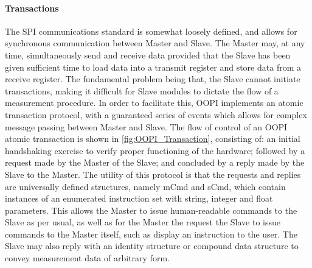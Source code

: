 \paragraph{Transactions}
\label{sec:OOPI_Transactions}
The SPI communications standard is somewhat loosely defined, and allows for synchronous communication between Master and Slave. The Master may, at any time, simultaneously send and receive data provided that the Slave has been given sufficient time to load data into a transmit register and store data from a receive register. The fundamental problem being that, the Slave cannot initiate transactions, making it difficult for Slave modules to dictate the flow of a measurement procedure. In order to facilitate this, OOPI implements an atomic transaction protocol, with a guaranteed series of events which allows for complex message passing between Master and Slave. The flow of control of an OOPI atomic transaction is shown in \cref{fig:OOPI_Transaction}, consisting of: an initial handshaking exercise to verify proper functioning of the hardware; followed by a request made by the Master of the Slave; and concluded by a reply made by the Slave to the Master. The utility of this protocol is that the requests and replies are universally defined structures, namely mCmd and sCmd, which contain instances of an enumerated instruction set with string, integer and float parameters. This allows the Master to issue human-readable commands to the Slave as per usual, as well as for the Master the request the Slave to issue commands to the Master itself, such as display an instruction to the user. The Slave may also reply with an identity structure or compound data structure to convey measurement data of arbitrary form. 


